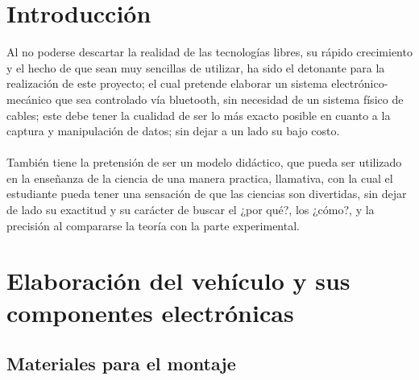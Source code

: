 \documentclass[12]{article}
\begin{document}
\begin{multicols}{2}
\section{Introducción}
Al no poderse descartar la realidad de las tecnologías libres, su rápido crecimiento y el hecho de que sean muy sencillas de utilizar, ha sido el detonante para la realización de este proyecto; el cual pretende elaborar un sistema electrónico-mecánico que sea controlado vía bluetooth, sin necesidad de un sistema físico de cables; este debe tener la cualidad de ser lo más exacto posible en cuanto a la captura y manipulación de datos; sin dejar a un lado su bajo costo. \\\\ También tiene la pretensión de ser un modelo didáctico, que pueda ser utilizado en la enseñanza de la ciencia de una manera practica, llamativa, con la cual el estudiante pueda tener una sensación de que las ciencias son divertidas, sin dejar de lado su exactitud y su carácter de buscar el ¿por qué?,  los ¿cómo?, y la precisión al compararse la teoría con la parte experimental.

\section{Elaboración del vehículo  y sus componentes electrónicas}

\subsection{ Materiales para el montaje}


\end{multicols}
\end{document}
